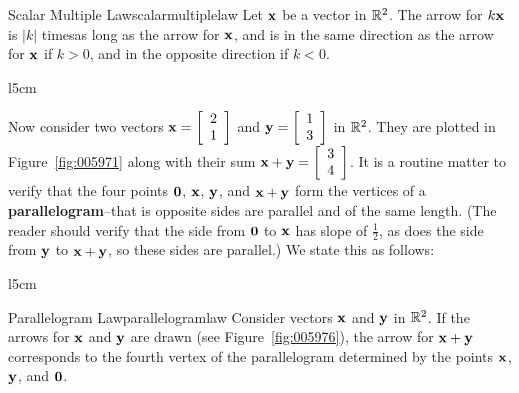 \hfill \begin{theorem*}{Scalar Multiple Law}{scalarmultiplelaw}
Let $\textbf{x}$ be a vector in $\mathbb{R}^2$. The arrow for $k\textbf{x}$ is $|k|$ times\footnotemark as long as the arrow for $\textbf{x}$, and is in the same direction as the arrow for $\textbf{x}$ if $k > 0$, and in the opposite direction if $k < 0$.
\end{theorem*}

\vspace*{0.1em}
\begin{wrapfigure}[7]{l}{5cm} 
\centering

\caption{\label{fig:005976}}
\end{wrapfigure}

Now consider two vectors $\textbf{x} = \left[ \begin{array}{rr}
2 \\
1
\end{array} \right]$
 and $\textbf{y} = \left[ \begin{array}{rr}
 1 \\
 3
 \end{array} \right]$
 in $\mathbb{R}^2$. They are plotted in Figure~\ref{fig:005971} along with their sum $\textbf{x} + \textbf{y} = \left[ \begin{array}{rr}
 3 \\
 4
 \end{array} \right]$.
 It is a routine matter to verify that the four points $\textbf{0}$, $\textbf{x}$, $\textbf{y}$, and $\textbf{x} + \textbf{y}$ form the vertices of a \textbf{parallelogram}--that is opposite sides are parallel and of the same length. (The reader should verify that the side from $\textbf{0}$ to $\textbf{x}$ has slope of $\frac{1}{2}$, as does the side from $\textbf{y}$ to $\textbf{x} + \textbf{y}$, so these sides are parallel.) We state this as follows:


\begin{wrapfigure}[4]{l}{5cm} 
\centering

\caption{\label{fig:005980}}
\end{wrapfigure}

\hfill \begin{theorem*}{Parallelogram Law}{parallelogramlaw}
Consider vectors $\textbf{x}$ and $\textbf{y}$ in $\mathbb{R}^2$. If the arrows for $\textbf{x}$ and $\textbf{y}$ are drawn (see Figure~\ref{fig:005976}), the arrow for $\textbf{x} + \textbf{y}$ corresponds to the fourth vertex of the parallelogram determined by the points $\textbf{x}$, $\textbf{y}$, and $\textbf{0}$.
\end{theorem*}

